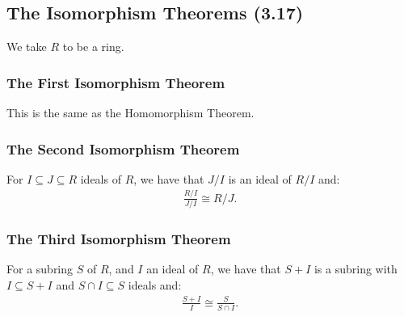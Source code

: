 \subsection{The Isomorphism Theorems (3.17)} \label{3.17}

We take $R$ to be a ring.

\subsubsection{The First Isomorphism Theorem}

This is the same as the Homomorphism Theorem.

\subsubsection{The Second Isomorphism Theorem}

For $I \subseteq J \subseteq R$ ideals of $R$, we have that
$J / I$ is an ideal of $R / I$ and: \begin{align*}
    \frac{R / I}{J / I} \cong {R / J}.
\end{align*}

\subsubsection{The Third Isomorphism Theorem}

For a subring $S$ of $R$, and $I$ an ideal of $R$, we have that
$S + I$ is a subring with $I \subseteq S + I$ and $S \cap I \subseteq S$ 
ideals and: \begin{align*}
    \frac{S + I}{I} \cong \frac{S}{S \cap I}.
\end{align*}
